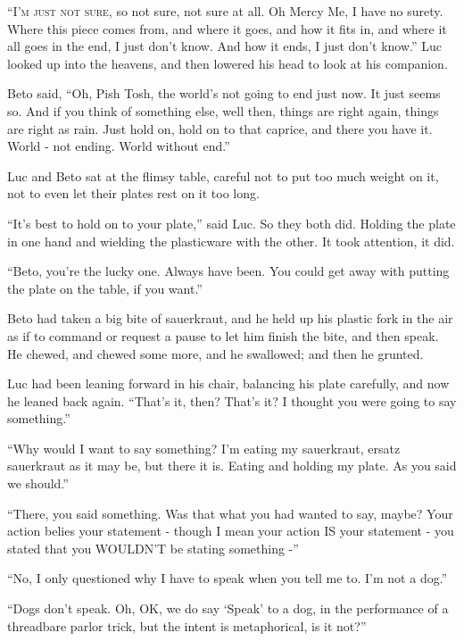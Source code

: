 
\lettrine{``I}{'m just not sure,} so not sure, not sure at all. Oh Mercy Me, I have
no surety. Where this piece comes from, and where it goes, and how it
fits in, and where it all goes in the end, I just don't know. And how it
ends, I just don't know.'' Luc looked up into the heavens, and then
lowered his head to look at his companion.

Beto said, ``Oh, Pish Tosh, the world's not going to end just now. It
just seems so. And if you think of something else, well then, things are
right again, things are right as rain. Just hold on, hold on to that
caprice, and there you have it. World - not ending. World without end.''

Luc and Beto sat at the flimsy table, careful not to put too much weight
on it, not to even let their plates rest on it too long.

``It's best to hold on to your plate,'' said Luc. So they both did.
Holding the plate in one hand and wielding the plasticware with the
other. It took attention, it did.

``Beto, you're the lucky one. Always have been. You could get away with
putting the plate on the table, if you want.''

Beto had taken a big bite of sauerkraut, and he held up his plastic fork
in the air as if to command or request a pause to let him finish the
bite, and then speak. He chewed, and chewed some more, and he swallowed;
and then he grunted.

Luc had been leaning forward in his chair, balancing his plate
carefully, and now he leaned back again. ``That's it, then? That's it? I
thought you were going to say something.''

``Why would I want to say something? I'm eating my sauerkraut, ersatz
sauerkraut as it may be, but there it is. Eating and holding my plate.
As you said we should.''

``There, you said something. Was that what you had wanted to say, maybe?
Your action belies your statement - though I mean your action IS your
statement - you stated that you WOULDN'T be stating something -''

``No, I only questioned why I have to speak when you tell me to. I'm not
a dog.''

``Dogs don't speak. Oh, OK, we do say `Speak' to a dog, in the
performance of a threadbare parlor trick, but the intent is
metaphorical, is it not?''

